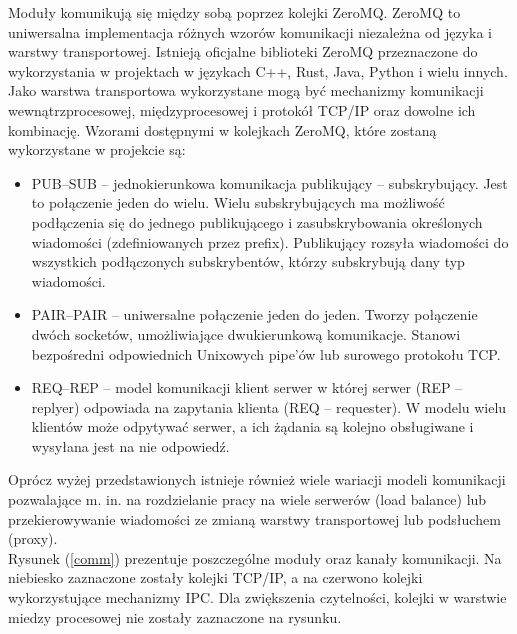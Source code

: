 \documentclass[15pt]{sprawozdanie}
\begin{document}
Moduły komunikują się między sobą poprzez kolejki ZeroMQ\cite{zmqguide}. ZeroMQ to uniwersalna implementacja różnych wzorów komunikacji niezależna od języka i warstwy transportowej. Istnieją oficjalne biblioteki ZeroMQ przeznaczone do wykorzystania w projektach w językach  C++, Rust, Java, Python i wielu innych. Jako warstwa transportowa wykorzystane mogą być mechanizmy komunikacji wewnątrzprocesowej, międzyprocesowej i protokół TCP/IP oraz dowolne ich kombinację. Wzorami dostępnymi w kolejkach ZeroMQ, które zostaną wykorzystane w projekcie są:

\begin{itemize}
\item PUB--SUB -- jednokierunkowa komunikacja publikujący --  subskrybujący. Jest to połączenie jeden do wielu.  Wielu subskrybujących ma możliwość podłączenia się do jednego publikującego i zasubskrybowania określonych wiadomości (zdefiniowanych przez prefix). Publikujący rozsyła wiadomości do wszystkich podłączonych subskrybentów, którzy subskrybują dany typ wiadomości.

\item PAIR--PAIR -- uniwersalne połączenie jeden do jeden. Tworzy połączenie dwóch socketów, umożliwiające dwukierunkową komunikacje. Stanowi bezpośredni odpowiednich Unixowych pipe'ów lub surowego protokołu TCP.

\item REQ--REP -- model komunikacji klient serwer w której serwer (REP -- replyer) odpowiada na zapytania klienta (REQ -- requester). W modelu wielu klientów może odpytywać serwer, a ich żądania są kolejno obsługiwane i wysyłana jest na nie odpowiedź.
\end{itemize}

Oprócz wyżej przedstawionych istnieje również wiele wariacji modeli komunikacji pozwalające m. in. na rozdzielanie pracy na wiele serwerów (load balance) lub przekierowywanie wiadomości ze zmianą warstwy transportowej lub podsłuchem (proxy).\\

Rysunek (\ref{comm}) prezentuje poszczególne moduły oraz kanały komunikacji. Na niebiesko zaznaczone zostały kolejki TCP/IP, a na czerwono kolejki wykorzystujące mechanizmy IPC. Dla zwiększenia czytelności, kolejki w warstwie miedzy procesowej nie zostały zaznaczone na rysunku.
\end{document}
